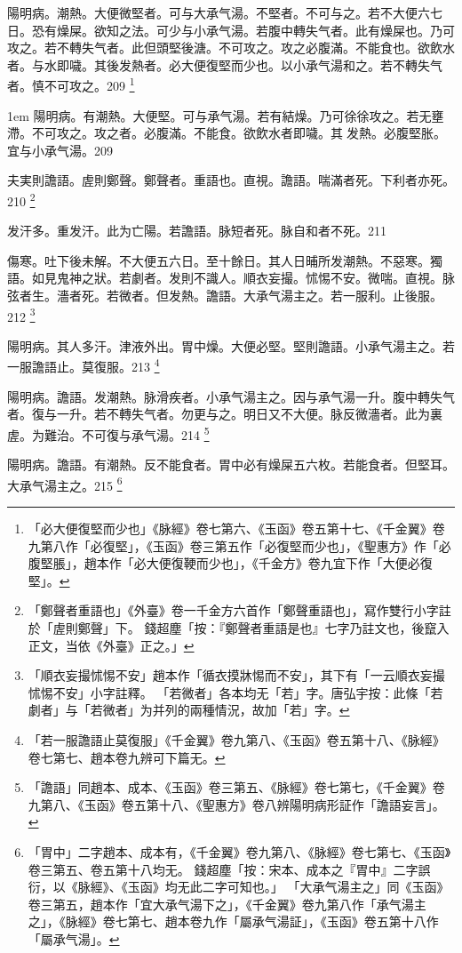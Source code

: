 陽明病。潮熱。大便微堅者。可与{\khaai 大}承气湯。不堅者。不可与之。若不大便六七日。恐有燥屎。欲知之法。可少与小承气湯。若腹中轉失气者。此有燥屎也。乃可攻之。若不轉失气者。此但頭堅後溏。不可攻之。攻之必腹滿。不能食也。欲飲水者。与水即噦。其後发熱者。必大便復堅而少也。以小承气湯和之。若不轉失气者。慎不可攻之。209
	\footnote{
		「必大便復堅而少也」《脉經》卷七第六、《玉函》卷五第十七、《千金翼》卷九第八作「必復堅」，《玉函》卷三第五作「必復堅而少也」，《聖惠方》作「必腹堅脹」，趙本作「必大便復鞕而少也」，《千金方》卷九宜下作「大便必復堅」。
	}

\hangindent 1em
陽明病。有潮熱。大便堅。可与承气湯。若有結燥。乃可徐徐攻之。若无壅滯。不可攻之。攻之者。必腹滿。不能食。欲飲水者即噦。其{\sungii 𠊱}发熱。必腹堅胀。宜与小承气湯。{\shenghui}209

夫実則譫語。虗則鄭聲。鄭聲者。重語也。直視。譫語。喘滿者死。下利者亦死。210
	\footnote{
		「鄭聲者重語也」《外臺》卷一千金方六首作「鄭聲重語也」，寫作雙行小字註於「虗則鄭聲」下。
		錢超塵「按：『鄭聲者重語是也』七字乃註文也，後竄入正文，当依《外臺》正之。」
	}

发汗多。重发汗。{\khaai 此为}亡陽。{\khaai 若}譫語。脉短者死。脉自和者不死。211

傷寒。吐下後未解。不大便五六日。至十餘日。其人日晡所发潮熱。不惡寒。獨語。如見鬼{\khaai 神之}狀。若劇者。发則不識人。順衣妄撮。怵惕不安。微喘。直視。脉弦者生。濇者死。{\khaai 若}微者。但发熱。譫語。{\khaai 大}承气湯主之。若一服利。止後服。212
	\footnote{
		「順衣妄撮怵惕不安」趙本作「循衣摸牀惕而不安」，其下有「一云順衣妄撮怵惕不安」小字註釋。
		「若微者」各本均无「若」字。唐弘宇按：此條「若劇者」与「若微者」为并列的兩種情況，故加「若」字。
	}

陽明病。其人多汗。津液外出。胃中燥。大便必堅。堅則譫語。{\khaai 小}承气湯主之。{\khaai 若一服譫語止。莫復服。}213
	\footnote{
		「若一服譫語止莫復服」《千金翼》卷九第八、《玉函》卷五第十八、《脉經》卷七第七、趙本卷九辨可下篇无。
	}

陽明病。譫語。发潮熱。脉滑疾者。{\khaai 小}承气湯主之。因与承气湯一升。腹中轉失气者。復与一升。若不轉失气者。勿更与之。明日又不大便。脉反微濇者。此为裏虗。为難治。不可復与承气湯。214
	\footnote{
		「譫語」同趙本、成本、《玉函》卷三第五、《脉經》卷七第七，《千金翼》卷九第八、《玉函》卷五第十八、《聖惠方》卷八辨陽明病形証作「譫語妄言」。
	}

陽明病。譫語。有潮熱。反不能食者。{\khaai 胃中}必有燥屎五六枚。若能食者。但堅耳。{\khaai 大}承气湯主之。215
	\footnote{
		「胃中」二字趙本、成本有，《千金翼》卷九第八、《脉經》卷七第七、《玉函》卷三第五、卷五第十八均无。
		錢超塵「按：宋本、成本之『胃中』二字誤衍，以《脉經》、《玉函》均无此二字可知也。」
		「大承气湯主之」同《玉函》卷三第五，趙本作「宜大承气湯下之」，《千金翼》卷九第八作「承气湯主之」，《脉經》卷七第七、趙本卷九作「屬承气湯証」，《玉函》卷五第十八作「屬承气湯」。
	}

